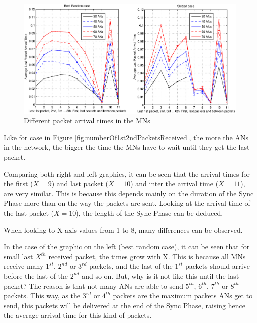 \begin{figure}[ht]
 \begin{center}
  \includegraphics[width=1\textwidth]{Lastarrivalpackettimes.eps}
 \end{center}
 \caption{Different packet arrival times in the \acp{MN}}
 \label{fig:Lastarrivalpackettimes}
\end{figure}

Like for case in Figure \ref{fig:numberOf1st2ndPacketsReceived}, the more the \acp{AN} in the network, the bigger the time the \acp{MN} have to wait 
until they get the last packet.

Comparing both right and left graphics, it can be seen that the arrival times for the first ($X=9$) and last packet ($X=10$) and inter the arrival 
time ($X=11$), are very similar. This is because this depends mainly on the duration of the Sync Phase more than on the way the packets are sent. 
Looking at the arrival time of the last packet ($X=10$), the length of the Sync Phase can be deduced.

When looking to X axis values from 1 to 8, many differences can be observed.

In the case of the graphic on the left (best random case), it can be seen that for small last $X^{th}$ received packet, the times grow with X. 
This is because all \acp{MN} receive many $1^{st}$, $2^{nd}$ or $3^{rd}$ packets, and the last of the $1^{st}$ packets should arrive 
before the last of the $2^{nd}$ and so on. But, why is it not like this until the last packet? The reason is that not many \acp{AN} are able to send
$5^{th}$, $6^{th}$, $7^{th}$ or $8^{th}$ packets. This way, as the $3^{rd}$ or $4^{th}$ packets are the maximum packets \acp{AN} get to send, 
this packets will be delivered at the end of the Sync Phase, raising hence the average arrival time for this kind of packets.

